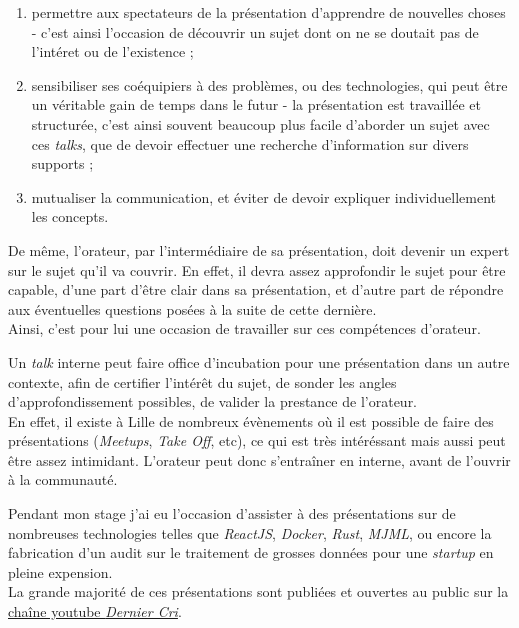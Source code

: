 \begin{enumerate}
\def\labelenumi{\arabic{enumi}.}
\tightlist
\item
  permettre aux spectateurs de la présentation d'apprendre de nouvelles
  choses - c'est ainsi l'occasion de découvrir un sujet dont on ne se
  doutait pas de l'intéret ou de l'existence ;\\
\item
  sensibiliser ses coéquipiers à des problèmes, ou des technologies, qui
  peut être un véritable gain de temps dans le futur - la présentation
  est travaillée et structurée, c'est ainsi souvent beaucoup plus facile
  d'aborder un sujet avec ces \emph{talks}, que de devoir effectuer une
  recherche d'information sur divers supports ;\\
\item
  mutualiser la communication, et éviter de devoir expliquer
  individuellement les concepts.
\end{enumerate}

\bigskip

De même, l'orateur, par l'intermédiaire de sa présentation, doit devenir
un expert sur le sujet qu'il va couvrir. En effet, il devra assez
approfondir le sujet pour être capable, d'une part d'être clair dans sa
présentation, et d'autre part de répondre aux éventuelles questions
posées à la suite de cette dernière.\\
Ainsi, c'est pour lui une occasion de travailler sur ces compétences
d'orateur.

\bigskip

Un \emph{talk} interne peut faire office d'incubation pour une
présentation dans un autre contexte, afin de certifier l'intérêt du
sujet, de sonder les angles d'approfondissement possibles, de valider la
prestance de l'orateur.\\
En effet, il existe à Lille de nombreux évènements où il est possible de
faire des présentations (\emph{Meetups}, \emph{Take Off}, etc), ce qui
est très intéréssant mais aussi peut être assez intimidant. L'orateur
peut donc s'entraîner en interne, avant de l'ouvrir à la communauté.

\bigskip

Pendant mon stage j'ai eu l'occasion d'assister à des présentations sur
de nombreuses technologies telles que \emph{ReactJS}, \emph{Docker},
\emph{Rust}, \emph{MJML}, ou encore la fabrication d'un audit sur le
traitement de grosses données pour une \emph{startup} en pleine
expension.\\
La grande majorité de ces présentations sont publiées et ouvertes au
public sur la
\href{https://www.youtube.com/channel/UCDfdBlzldhg_PEu3xZTPsHg}{chaîne
youtube \emph{Dernier Cri}}.

